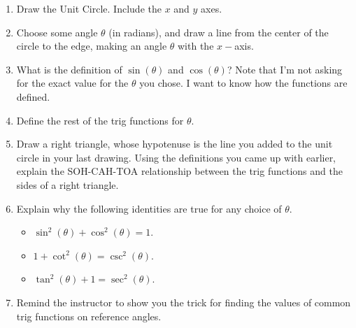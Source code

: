 \documentclass[11pt]{article}
\begin{document}
\begin{enumerate}
\item Draw the Unit Circle. Include the $x$ and $y$ axes.
\item Choose some angle $\theta$ (in radians), and draw a line from the center of the circle to the edge, making an angle $\theta$ with the $x-$axis.
\item What is the definition of $\sin(\theta)$ and $\cos(\theta)$? Note that I'm not asking for the exact value for the $\theta$ you chose. I want to know how the functions are defined.
\item Define the rest of the trig functions for $\theta$.
\item Draw a right triangle, whose hypotenuse is the line you added to the unit circle in your last drawing. Using the definitions you came up with earlier, explain the SOH-CAH-TOA relationship between the trig functions and the sides of a right triangle. 
\item Explain why the following identities are true for any choice of $\theta$.
\begin{itemize}
\item $\sin^2(\theta) + \cos^2(\theta) = 1$.
\item $1 + \cot^2(\theta) = \csc^2(\theta)$.
\item $\tan^2(\theta) + 1 = \sec^2(\theta)$.
\end{itemize}
\item Remind the instructor to show you the trick for finding the values of common trig functions on reference angles.
\end{enumerate}
\end{document}
